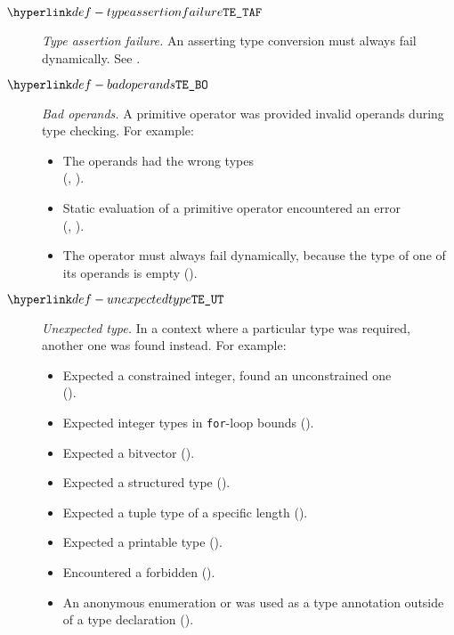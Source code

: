 \begin{description}
\hypertarget{def-typeassertionfailure}{}
\item[$\TypeAssertionFailure$]
  \textit{Type assertion failure.}
  An asserting type conversion must always fail dynamically.
  See .

\hypertarget{def-badoperands}{}
\item[$\BadOperands$]
  \textit{Bad operands.}
  A primitive operator was provided invalid operands during type checking.
  For example:
  \begin{itemize}
    \item The operands had the wrong types \\
      (, ).
    \item Static evaluation of a primitive operator encountered an error \\
      (, ).
    \item The operator must always fail dynamically, because the type of one of its operands is empty ().
  \end{itemize}

\hypertarget{def-unexpectedtype}{}
\item[$\UnexpectedType$]
  \textit{Unexpected type.}
  In a context where a particular type was required, another one was found instead.
  For example:
  \begin{itemize}
    \item Expected a constrained integer, found an unconstrained one \\
      ().
    \item Expected integer types in \texttt{for}-loop bounds ().
    \item Expected a bitvector ().
    \item Expected a structured type ().
    \item Expected a tuple type of a specific length ().
    \item Expected a printable type ().
    \item Encountered a forbidden \pendingconstrainedintegertype{} ().
    \item An anonymous enumeration or \structuredtype{} was used as a type annotation outside of a type declaration ().
  \end{itemize}


\end{description}

